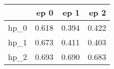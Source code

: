 \begin{tabular}{lrrr}
\toprule
{} &   ep 0 &   ep 1 &   ep 2 \\
\midrule
hp\_0 &  0.618 &  0.394 &  0.422 \\
hp\_1 &  0.673 &  0.411 &  0.403 \\
hp\_2 &  0.693 &  0.690 &  0.683 \\
\bottomrule
\end{tabular}
